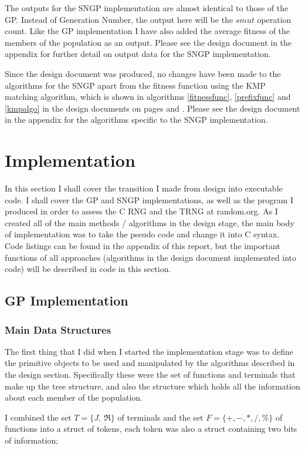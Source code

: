 \documentclass[a4paper,10.5pt]{article}
\begin{document}
The outputs for the SNGP implementation are almost identical to those of the GP. Instead of Generation Number, the output here will be the $smut$ operation count. Like the GP implementation I have also added the average fitness of the members of the population as an output. Please see the design document in the appendix for further detail on output data for the SNGP implementation.

Since the design document was produced, no changes have been made to the algorithms for the SNGP apart from the fitness function using the KMP matching algorithm, which is shown in algorithms \ref{fitnessfunc}, \ref{prefixfunc} and \ref{kmpalgo} in the design documents on pages \pageref{kmpalgo} and \pageref{fitnessfunc}. Please see the design document in the appendix for the algorithms specific to the SNGP implementation.

\newpage
\section{Implementation}
In this section I shall cover the transition I made from design into executable code. I shall cover the GP and SNGP implementations, as well as the program I produced in order to assess the C RNG and the TRNG at random.org. As I created all of the main methods / algorithms in the design stage, the main body of implementation was to take the pseudo code and change it into C syntax. Code listings can be found in the appendix of this report, but the important functions of all approaches (algorithms in the design document implemented into code) will be described in code in this section.

\subsection{GP Implementation}

\subsubsection{Main Data Structures}
The first thing that I did when I started the implementation stage was to define the primitive objects to be used and manipulated by the algorithms described in the design section. Specifically these were the set of functions and terminals that make up the tree structure, and also the structure which holds all the information about each member of the population.

I combined the set $T = \{J,\ \Re\}$ of terminals and the set $F = \{+, -, *, /, \%\}$ of functions into a struct of tokens, each token was also a struct containing two bits of information;
\end{document}
